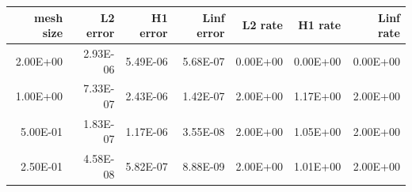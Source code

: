 \begin{tabular}{rrrrrrr}
\toprule
mesh size & L2 error & H1 error & Linf error & L2 rate & H1 rate & Linf rate \\
\midrule
2.00E+00 & 2.93E-06 & 5.49E-06 & 5.68E-07 & 0.00E+00 & 0.00E+00 & 0.00E+00 \\
1.00E+00 & 7.33E-07 & 2.43E-06 & 1.42E-07 & 2.00E+00 & 1.17E+00 & 2.00E+00 \\
5.00E-01 & 1.83E-07 & 1.17E-06 & 3.55E-08 & 2.00E+00 & 1.05E+00 & 2.00E+00 \\
2.50E-01 & 4.58E-08 & 5.82E-07 & 8.88E-09 & 2.00E+00 & 1.01E+00 & 2.00E+00 \\
\bottomrule
\end{tabular}
